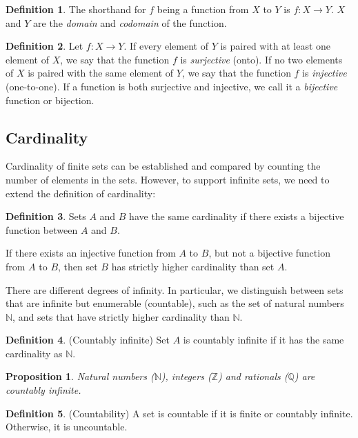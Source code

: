 \documentclass{book}
\theoremstyle{plain}%
\newtheorem{proposition}{Proposition}[section]
\theoremstyle{definition}
\newtheorem{definition}{Definition}[section]
\newlength{\arrow}
\begin{document}
\begin{appendices}
\begin{definition}
The shorthand for $f$ being a function from $X$ to $Y$ is $f: X \longrightarrow Y$. $X$ and $Y$ are the \textit{domain} and \textit{codomain} of the function. 
\end{definition}

\begin{definition} Let $f: X \longrightarrow Y$. If every element of $Y$ is paired with at least one element of $X$, we say that the function $f$ is \emph{surjective} (onto). If no two elements of $X$ is paired with the same element of $Y$, we say that the function $f$ is \emph{injective} (one-to-one). If a function is both surjective and injective, we call it a \emph{bijective} function or bijection.
\end{definition}




\subsection*{Cardinality}

Cardinality of finite sets can be established and compared by counting the number of elements in the sets. However, to support infinite sets, we need to extend the definition of cardinality:

\begin{definition} Sets $A$ and $B$ have the same cardinality if there exists a bijective function between $A$ and $B$.

If there exists an injective function from $A$ to $B$, but not a bijective function from $A$ to $B$, then set $B$ has strictly higher cardinality than set $A$.
\end{definition}

There are different degrees of infinity. In particular, we distinguish between sets that are infinite but enumerable (countable), such as the set of natural numbers $\mathbb{N}$, and sets that have strictly higher cardinality than $\mathbb{N}$.

\begin{definition}(Countably infinite) Set $A$ is countably infinite if it has the same cardinality as $\mathbb{N}$.
\end{definition}

\begin{proposition} Natural numbers ($\mathbb{N}$), integers ($\mathbb{Z}$) and rationals ($\mathbb{Q}$) are countably infinite.
\end{proposition}

\begin{definition}(Countability) A set is countable if it is finite or countably infinite. Otherwise, it is uncountable.
\end{definition}


\end{appendices}
\end{document}
